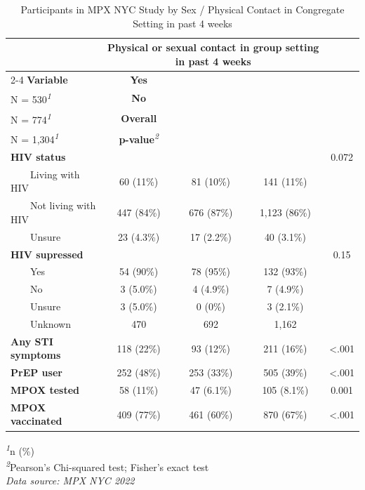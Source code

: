 \documentclass[
  letterpaper,
  DIV=11,
  numbers=noendperiod,
  oneside]{scrreprt}
\begin{document}
\hypertarget{tbl-health}{}
\setlength{\LTpost}{0mm}
\begin{longtable}{lcccc}
\caption{\label{tbl-health}Participants in MPX NYC Study by Sex / Physical Contact in Congregate
Setting in past 4 weeks }\tabularnewline

\toprule
 & \multicolumn{3}{c}{\textbf{Physical or sexual contact in group setting in past 4 weeks}} &  \\ 
\cmidrule(lr){2-4}
\textbf{Variable} & \textbf{Yes}\\
N = 530\textsuperscript{\textit{1}} & \textbf{No}\\
N = 774\textsuperscript{\textit{1}} & \textbf{Overall}\\
N = 1,304\textsuperscript{\textit{1}} & \textbf{p-value}\textsuperscript{\textit{2}} \\ 
\midrule\addlinespace[2.5pt]
\textbf{HIV status} &  &  &  & 0.072 \\ 
    Living with HIV & 60 (11\%) & 81 (10\%) & 141 (11\%) &  \\ 
    Not living with HIV & 447 (84\%) & 676 (87\%) & 1,123 (86\%) &  \\ 
    Unsure & 23 (4.3\%) & 17 (2.2\%) & 40 (3.1\%) &  \\ 
\textbf{HIV supressed} &  &  &  & 0.15 \\ 
    Yes & 54 (90\%) & 78 (95\%) & 132 (93\%) &  \\ 
    No & 3 (5.0\%) & 4 (4.9\%) & 7 (4.9\%) &  \\ 
    Unsure & 3 (5.0\%) & 0 (0\%) & 3 (2.1\%) &  \\ 
    Unknown & 470 & 692 & 1,162 &  \\ 
\textbf{Any STI symptoms} & 118 (22\%) & 93 (12\%) & 211 (16\%) & <.001 \\ 
\textbf{PrEP user} & 252 (48\%) & 253 (33\%) & 505 (39\%) & <.001 \\ 
\textbf{MPOX tested} & 58 (11\%) & 47 (6.1\%) & 105 (8.1\%) & 0.001 \\ 
\textbf{MPOX vaccinated} & 409 (77\%) & 461 (60\%) & 870 (67\%) & <.001 \\ 
\bottomrule
\end{longtable}
\begin{minipage}{\linewidth}
\textsuperscript{\textit{1}}n (\%)\\
\textsuperscript{\textit{2}}Pearson's Chi-squared test; Fisher's exact test\\
\emph{Data source: MPX NYC 2022}\\
\end{minipage}
\end{document}
